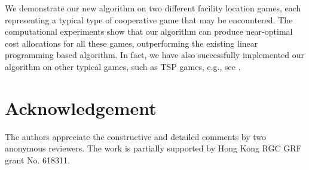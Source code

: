 \documentclass[ijoc,nonblindrev]{informs3} %
\begin{document}
We demonstrate our new algorithm on two different facility location games, each representing a typical type of cooperative game that may be encountered. The computational experiments show that our algorithm can produce near-optimal cost allocations for all these games, outperforming the existing linear programming based algorithm. In fact, we have also successfully implemented our algorithm on other typical games, such as TSP games, e.g., see \cite{liulindongthesis}.

\section*{Acknowledgement}
The authors appreciate the constructive and detailed comments by two anonymous reviewers. The work is partially supported by Hong Kong RGC GRF grant No. 618311.

%






\newpage
%
%
%
\end{document}
